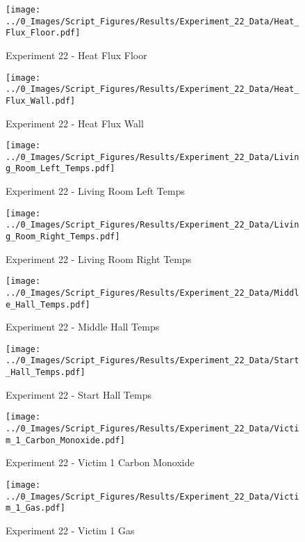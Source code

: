 	\begin{figure}[H]
		\centering
		\texttt{[image: ../0\_Images/Script\_Figures/Results/Experiment\_22\_Data/Heat\_Flux\_Floor.pdf]}
		\caption[]{Experiment 22 - Heat Flux Floor}
	\end{figure}
 
	\clearpage

	\begin{figure}[H]
		\centering
		\texttt{[image: ../0\_Images/Script\_Figures/Results/Experiment\_22\_Data/Heat\_Flux\_Wall.pdf]}
		\caption[]{Experiment 22 - Heat Flux Wall}
	\end{figure}
 

	\begin{figure}[H]
		\centering
		\texttt{[image: ../0\_Images/Script\_Figures/Results/Experiment\_22\_Data/Living\_Room\_Left\_Temps.pdf]}
		\caption[]{Experiment 22 - Living Room Left Temps}
	\end{figure}
 
	\clearpage

	\begin{figure}[H]
		\centering
		\texttt{[image: ../0\_Images/Script\_Figures/Results/Experiment\_22\_Data/Living\_Room\_Right\_Temps.pdf]}
		\caption[]{Experiment 22 - Living Room Right Temps}
	\end{figure}
 

	\begin{figure}[H]
		\centering
		\texttt{[image: ../0\_Images/Script\_Figures/Results/Experiment\_22\_Data/Middle\_Hall\_Temps.pdf]}
		\caption[]{Experiment 22 - Middle Hall Temps}
	\end{figure}
 
	\clearpage

	\begin{figure}[H]
		\centering
		\texttt{[image: ../0\_Images/Script\_Figures/Results/Experiment\_22\_Data/Start\_Hall\_Temps.pdf]}
		\caption[]{Experiment 22 - Start Hall Temps}
	\end{figure}
 

	\begin{figure}[H]
		\centering
		\texttt{[image: ../0\_Images/Script\_Figures/Results/Experiment\_22\_Data/Victim\_1\_Carbon\_Monoxide.pdf]}
		\caption[]{Experiment 22 - Victim 1 Carbon Monoxide}
	\end{figure}
 
	\clearpage

	\begin{figure}[H]
		\centering
		\texttt{[image: ../0\_Images/Script\_Figures/Results/Experiment\_22\_Data/Victim\_1\_Gas.pdf]}
		\caption[]{Experiment 22 - Victim 1 Gas}
	\end{figure}
 

